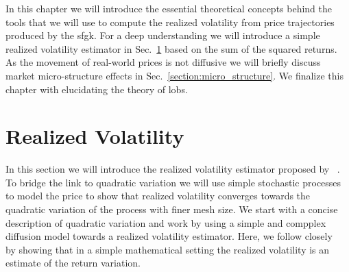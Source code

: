 \documentclass[11pt, a4paper]{thesis}  %
\begin{document}

In this chapter we will introduce the essential theoretical concepts behind the tools that we will use to compute the realized volatility from  price trajectories produced by the \ac{sfgk}. For a deep understanding we will introduce a simple realized volatility estimator in Sec.~\ref{section:realized_vol} based on the sum of the squared returns. As the movement of real-world prices is not diffusive we will briefly discuss market micro-structure effects \cite{Hansen:2006:micro_structure, Phillips:2005:comment_micro_structure} in Sec.~\ref{section:micro_structure}. We finalize this chapter with elucidating the theory of \acp{lob}.
 
\section{Realized Volatility}
\label{section:realized_vol}
In this section we will introduce the realized volatility estimator proposed by \citeauthor{Anderson:2000:GreatRealisations}~\cite{Anderson:2000:GreatRealisations}. To bridge the link to quadratic variation we will use simple stochastic processes to model the price to show that realized volatility converges towards the quadratic variation of the process with finer mesh size. We start with a concise description of quadratic variation and work by using a simple and compplex diffusion model towards a realized volatility estimator. Here, we follow closely \citeauthor{Andersen:2008:realized_vol}~\cite{Andersen:2008:realized_vol} by showing that in a simple mathematical setting the realized volatility is an estimate of the return variation.
\end{document}
